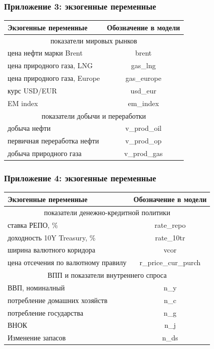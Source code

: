 \documentclass[9pt]{beamer}
\begin{document}
\begin{frame}
	\frametitle{Приложение 3: экзогенные переменные}
\begin{center}
	\small
	\begin{tabular}{ l | c }
		\toprule
		Экзогенные переменные  &  Обозначение в модели  \\
		\midrule
		\multicolumn{2}{c}{показатели мировых рынков}\\
		\midrule
		цена нефти марки Brent & brent \\
		цена природного газа, LNG & gas\_lng \\
		цена природного газа, Europe & gas\_europe \\
		курс USD/EUR & usd\_eur \\
		EM index & em\_index \\
		\midrule
		\multicolumn{2}{c}{показатели добычи и переработки}\\
		\midrule
		добыча нефти & v\_prod\_oil \\
		первичная переработка нефти & v\_prod\_op \\
		добыча природного газа & v\_prod\_gas \\
		\bottomrule			
	\end{tabular}
	\label{tab:4} 
	\normalsize
\end{center}
\end{frame}



\begin{frame}
	\frametitle{Приложение 4: экзогенные переменные}
	\begin{center}
		\small
		\begin{tabular}{ l | c }
			\toprule
			Экзогенные переменные  &  Обозначение в модели  \\
			\midrule
			\multicolumn{2}{c}{показатели денежно-кредитной политики}\\
			\midrule
			ставка РЕПО, \% & rate\_repo \\ 
			доходность 10Y Treasury, \% & rate\_10tr \\
			ширина валютного коридора & vcor \\		
			цена отсечения по валютному правилу & r\_price\_cur\_purch\\
			\midrule	
			\multicolumn{2}{c}{ВПП и показатели внутреннего спроса}\\
			\midrule
			ВВП, номиналный & n\_y \\ 
			потребление домашних хозяйств & n\_c \\ 
			потребление государства & n\_g \\
			ВНОК & n\_j  \\ 
			Изменение запасов & n\_ds \\
			\bottomrule			
		\end{tabular}
		\label{tab:5} 
		\normalsize
	\end{center}
\end{frame}
\end{document}
